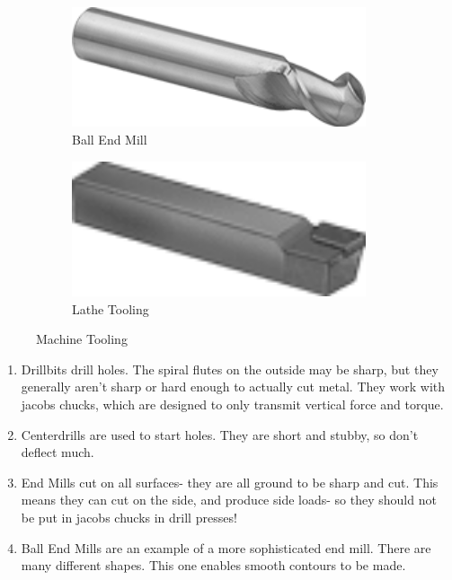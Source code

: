 \documentclass[10pt,letterpaper]{book}
\begin{document}
\begin{figure}[H]
\begin{subfigure}[b]{.19\linewidth}
		\includegraphics[width=0.95\textwidth]{imgs/ball_endmill.png}
		\caption{Ball End Mill}
	\end{subfigure}\begin{subfigure}[b]{.19\linewidth}
		\includegraphics[width=0.95\textwidth]{imgs/lathetool.png}
		\caption{Lathe Tooling}
	\end{subfigure}	
	
	\caption{Machine Tooling}
\end{figure}

 \begin{enumerate}[label=\alph*]
 	\item Drillbits drill holes. The spiral flutes on the outside may be sharp, but they generally aren't sharp or hard enough to actually cut metal. They work with jacobs chucks, which are designed to only transmit vertical force and torque.
 	\item Centerdrills are used to start holes. They are short and stubby, so don't deflect much.
 	\item End Mills cut on all surfaces- they are all ground to be sharp and cut. This means they can cut on the side, and produce side loads- so they should not be put in jacobs chucks in drill presses!
 	\item Ball End Mills are an example of a more sophisticated end mill. There are many different shapes. This one enables smooth contours to be made.
 \end{enumerate}
 
\end{document}
